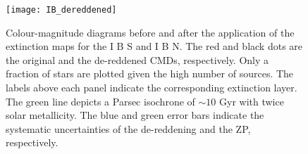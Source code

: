 \documentclass{aa}
\begin{document}
    
       \begin{figure}
   \texttt{[image: IB\_dereddened]}
   \caption{Colour-magnitude diagrams before and after the application of the extinction maps for the I B S and I B N. The red and black dots are the original and the de-reddened CMDs, respectively. Only a fraction of stars are plotted given the high number of sources. The labels above each panel indicate the corresponding extinction layer. The green line depicts a Parsec isochrone of $\sim 10$ Gyr with twice solar metallicity. The blue and green error bars indicate the systematic uncertainties of the de-reddening and the ZP, respectively.}

   \label{dereddened2}
    \end{figure}
    


    
\end{document}
